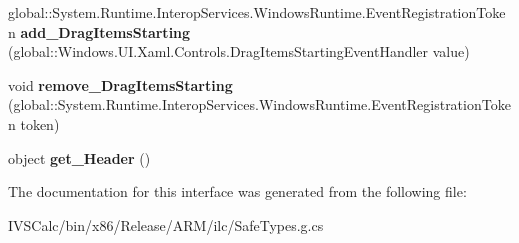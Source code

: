 \begin{DoxyCompactItemize}
global\+::\+System.\+Runtime.\+Interop\+Services.\+Windows\+Runtime.\+Event\+Registration\+Token {\bfseries add\+\_\+\+Drag\+Items\+Starting} (global\+::\+Windows.\+U\+I.\+Xaml.\+Controls.\+Drag\+Items\+Starting\+Event\+Handler value)
\item 
\mbox{\label{interface_windows_1_1_u_i_1_1_xaml_1_1_controls_1_1_i_list_view_base_a98ffdf8ce44a2620717a8e03273d9029}} 
void {\bfseries remove\+\_\+\+Drag\+Items\+Starting} (global\+::\+System.\+Runtime.\+Interop\+Services.\+Windows\+Runtime.\+Event\+Registration\+Token token)
\item 
\mbox{\label{interface_windows_1_1_u_i_1_1_xaml_1_1_controls_1_1_i_list_view_base_a7a7ead1b392f70c5f393d65cf2a4de87}} 
object {\bfseries get\+\_\+\+Header} ()
\end{DoxyCompactItemize}


The documentation for this interface was generated from the following file\+:\begin{DoxyCompactItemize}
\item 
I\+V\+S\+Calc/bin/x86/\+Release/\+A\+R\+M/ilc/Safe\+Types.\+g.\+cs\end{DoxyCompactItemize}
